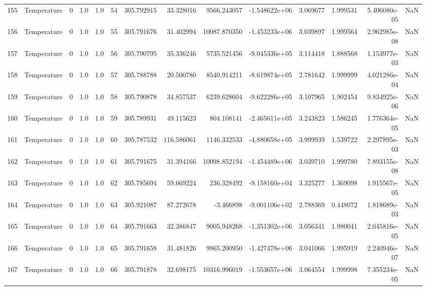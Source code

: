 \begin{tabular}{llrrrrrrrrrrrr}
155 &  Temperature &       0 &  1.0 &  1.0 &   54 &  305.792915 &    33.328016 &    9566.243057 & -1.548622e+06 &  3.069677 &  1.999531 &  5.406080e-05 &      NaN \\
156 &  Temperature &       0 &  1.0 &  1.0 &   55 &  305.791676 &    31.402994 &   10087.870350 & -1.453233e+06 &  3.039897 &  1.999564 &  2.962985e-08 &      NaN \\
157 &  Temperature &       0 &  1.0 &  1.0 &   56 &  305.790795 &    35.336246 &    5735.521456 & -9.045336e+05 &  3.114418 &  1.888568 &  1.153977e-03 &      NaN \\
158 &  Temperature &       0 &  1.0 &  1.0 &   57 &  305.788788 &    20.500780 &    8540.914211 & -8.619874e+05 &  2.781642 &  1.999999 &  4.021286e-04 &      NaN \\
159 &  Temperature &       0 &  1.0 &  1.0 &   58 &  305.790878 &    34.857537 &    6239.628604 & -9.622286e+05 &  3.107965 &  1.902454 &  9.834925e-06 &      NaN \\
160 &  Temperature &       0 &  1.0 &  1.0 &   59 &  305.789931 &    49.115623 &     804.108141 & -2.465611e+05 &  3.243823 &  1.586245 &  1.776364e-05 &      NaN \\
161 &  Temperature &       0 &  1.0 &  1.0 &   60 &  305.787532 &   116.586061 &    1146.332533 & -4.880658e+05 &  3.999939 &  1.539722 &  2.297895e-03 &      NaN \\
162 &  Temperature &       0 &  1.0 &  1.0 &   61 &  305.791675 &    31.394166 &   10098.852194 & -1.454489e+06 &  3.039710 &  1.999780 &  7.893155e-08 &      NaN \\
163 &  Temperature &       0 &  1.0 &  1.0 &   62 &  305.785694 &    59.669224 &     236.328492 & -9.158160e+04 &  3.325277 &  1.369098 &  1.915567e-05 &      NaN \\
164 &  Temperature &       0 &  1.0 &  1.0 &   63 &  305.921087 &    87.272678 &      -3.466898 & -9.001106e+02 &  2.788369 &  0.448072 &  1.818689e-03 &      NaN \\
165 &  Temperature &       0 &  1.0 &  1.0 &   64 &  305.791663 &    32.386847 &    9005.948268 & -1.351302e+06 &  3.056341 &  1.980041 &  2.045816e-05 &      NaN \\
166 &  Temperature &       0 &  1.0 &  1.0 &   65 &  305.791658 &    31.481826 &    9865.200950 & -1.427478e+06 &  3.041066 &  1.995919 &  2.240946e-07 &      NaN \\
167 &  Temperature &       0 &  1.0 &  1.0 &   66 &  305.791878 &    32.698175 &   10316.996019 & -1.553657e+06 &  3.064554 &  1.999998 &  7.355234e-05 &      NaN \\

\end{tabular}
